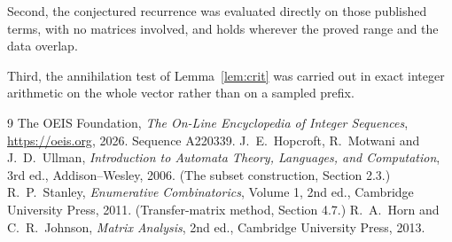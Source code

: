 \documentclass[11pt,a4paper]{article}
\theoremstyle{plain}
\theoremstyle{definition}
\begin{document}
Second, the conjectured recurrence was evaluated directly on those published terms, with no
matrices involved, and holds wherever the proved range and the data overlap.

Third, the annihilation test of Lemma~\ref{lem:crit} was carried out in exact integer
arithmetic on the whole vector rather than on a sampled prefix.

\begin{thebibliography}{9}
 The OEIS Foundation, \emph{The On-Line Encyclopedia of Integer
Sequences}, \url{https://oeis.org}, 2026. Sequence A220339.
 J.~E.~Hopcroft, R.~Motwani and J.~D.~Ullman, \emph{Introduction to Automata
Theory, Languages, and Computation}, 3rd ed., Addison--Wesley, 2006. (The subset
construction, Section 2.3.)
 R.~P.~Stanley, \emph{Enumerative Combinatorics}, Volume 1, 2nd ed.,
Cambridge University Press, 2011. (Transfer-matrix method, Section 4.7.)
 R.~A.~Horn and C.~R.~Johnson, \emph{Matrix Analysis}, 2nd ed., Cambridge
University Press, 2013.
\end{thebibliography}
\end{document}
